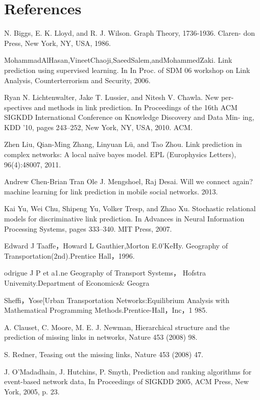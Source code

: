 \documentclass[onecolumn,preprintnumbers,amsmath,amssymb]{revtex4}
\begin{document}
\section*{References}
\begin{thebibliography}{00}

N. Biggs, E. K. Lloyd, and R. J. Wilson. Graph Theory, 1736-1936. Claren- don Press, New York, NY, USA, 1986.

MohammadAlHasan,VineetChaoji,SaeedSalem,andMohammedZaki. Link prediction using supervised learning. In In Proc. of SDM 06 workshop on Link Analysis, Counterterrorism and Security, 2006.

Ryan N. Lichtenwalter, Jake T. Lussier, and Nitesh V. Chawla. New per- spectives and methods in link prediction. In Proceedings of the 16th ACM SIGKDD International Conference on Knowledge Discovery and Data Min- ing, KDD ’10, pages 243–252, New York, NY, USA, 2010. ACM.

Zhen Liu, Qian-Ming Zhang, Linyuan Lü, and Tao Zhou. Link prediction in complex networks: A local naïve bayes model. EPL (Europhysics Letters), 96(4):48007, 2011.

Andrew Chen-Brian Tran Ole J. Mengshoel, Raj Desai. Will we connect again? machine learning for link prediction in mobile social networks. 2013.

Kai Yu, Wei Chu, Shipeng Yu, Volker Tresp, and Zhao Xu. Stochastic
relational models for discriminative link prediction. In Advances in Neural Information Processing Systems, pages 333–340. MIT Press, 2007.

Edward J Taaffe，Howard L Gauthier,Morton E.0’KeHy.
Geography of Transportation(2nd).Prentice Hall，1996.

odrigue J P et a1.ne Geography of Transport Systems，
Hofstra Univemity.Department of Economics\& Geogra

Sheffi，Yose[Urban Transportation Networks:Equilibrium Analysis with Mathematical Programming Methods.Prentice-Hall，Inc，1 985.

A. Clauset, C. Moore, M. E. J. Newman, Hierarchical structure and the prediction of missing links in networks, Nature 453 (2008) 98.

S. Redner, Teasing out the missing links, Nature 453 (2008) 47.

J. O’Madadhain, J. Hutchins, P. Smyth, Prediction and ranking algorithms for event-based network data, In Proceedings of SIGKDD 2005, ACM Press, New York, 2005, p. 23.


\end{thebibliography}
\end{document}
